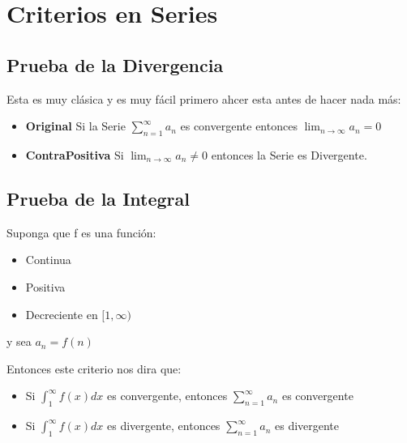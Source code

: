 \documentclass[12pt]{report}							    %
\begin{document}
\clearpage
\chapter{Criterios en Series}

    \clearpage
    \section{Prueba de la Divergencia}
        Esta es muy clásica y es muy fácil primero ahcer esta antes
        de hacer nada más:

        \begin{itemize}
            \item \textbf{Original} Si la Serie $\sum_{n=1}^{\infty} a_n$ es
            convergente entonces $\lim_{n \to \infty} a_n = 0$

            \item \textbf{ContraPositiva} Si $\lim_{n \to \infty} a_n \neq 0$ entonces la Serie es Divergente.
        \end{itemize}

    \clearpage
    \section{Prueba de la Integral}
        Suponga que f es una función:

        \begin{itemize}
            \item Continua
            \item Positiva
            \item Decreciente en $[1, \infty)$
        \end{itemize}

        y sea $a_n = f(n)$

        Entonces este criterio nos dira que:
        \begin{itemize}
           \item Si $\int_1^{\infty}f(x) dx$ es convergente, entonces $\sum_{n=1}^{\infty} a_n$ es convergente
           \item Si $\int_1^{\infty}f(x) dx$ es divergente, entonces $\sum_{n=1}^{\infty} a_n$ es divergente
        \end{itemize}
\end{document}
